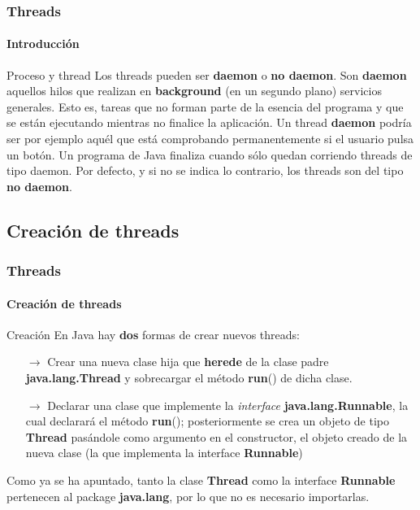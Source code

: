 \documentclass{beamer}
\begin{document}
    \begin{frame}
		\frametitle{Threads}
		\framesubtitle{Introducci\'on}

		\begin{alertblock}{Proceso y thread}
			Los threads pueden ser \textbf{daemon} o \textbf{no daemon}. Son \textbf{daemon} aquellos hilos que realizan en \textbf{background} (en un segundo plano) servicios generales. Esto es, tareas que no forman parte de la esencia del programa y que se est\'an ejecutando mientras no finalice la aplicaci\'on. Un thread \textbf{daemon} podr\'ia ser por ejemplo aqu\'el que est\'a comprobando permanentemente si el usuario pulsa un bot\'on. Un programa de Java finaliza cuando s\'olo quedan corriendo threads de tipo daemon. Por defecto, y si no se indica lo contrario, los threads son del tipo \textbf{no daemon}.
        \end{alertblock}
	\end{frame}

    \subsection{Creaci\'on de threads}

	\begin{frame}
		\frametitle{Threads}
		\framesubtitle{Creaci\'on de threads}

		\begin{block}{Creaci\'on}
            En Java hay \textbf{dos} formas de crear nuevos threads:
            \begin{itemize}
                \item[$\rightarrow$] Crear una nueva clase hija que \textbf{herede} de la clase padre \textbf{java.lang.Thread} y sobrecargar el m\'etodo \textbf{run}() de dicha clase.
                \item[$\rightarrow$] Declarar una clase que implemente la \emph{interface} \textbf{java.lang.Runnable}, la cual declarar\'a el m\'etodo \textbf{run}(); posteriormente se crea un objeto de tipo \textbf{Thread} pas\'andole como argumento en el constructor, el objeto creado de la nueva clase (la que implementa la interface \textbf{Runnable})
            \end{itemize}
        \end{block}
        \begin{block}{}
            Como ya se ha apuntado, tanto la clase \textbf{Thread} como la interface \textbf{Runnable} pertenecen al package \textbf{java.lang}, por lo que no es necesario importarlas.
        \end{block}
	\end{frame}
	
\end{document}
